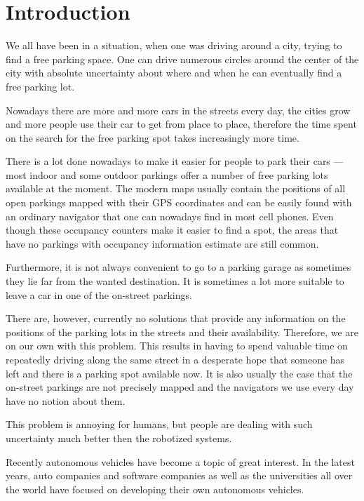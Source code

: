 \chapter{Introduction} %
\label{cha:introduction}
    We all have been in a situation, when one was driving around a city, trying to find a free parking space. One can drive numerous circles around the center of the city with absolute uncertainty about where and when he can eventually find a free parking lot.

    Nowadays there are more and more cars in the streets every day, the cities grow and more people use their car to get from place to place, therefore the time spent on the search for the free parking spot takes increasingly more time.

    There is a lot done nowadays to make it easier for people to park their cars --- most indoor and some outdoor parkings offer a number of free parking lots available at the moment. The modern maps usually contain the positions of all open parkings mapped with their GPS coordinates and can be easily found with an ordinary navigator that one can nowadays find in most cell phones. Even though these occupancy counters make it easier to find a spot, the areas that have no parkings with occupancy information estimate are still common.

    Furthermore, it is not always convenient to go to a parking garage as sometimes they lie far from the wanted destination. It is sometimes a lot more suitable to leave a car in one of the on-street parkings.

    There are, however, currently no solutions that provide any information on the positions of the parking lots in the streets and their availability. Therefore, we are on our own with this problem. This results in having to spend valuable time on repeatedly driving along the same street in a desperate hope that someone has left and there is a parking spot available now. It is also usually the case that the on-street parkings are not precisely mapped and the navigators we use every day have no notion about them.

    This problem is annoying for humans, but people are dealing with such uncertainty much better then the robotized systems.

    Recently autonomous vehicles have become a topic of great interest.
    In the latest years, auto companies and software companies as well as the universities all over the world have focused on developing their own autonomous vehicles.


